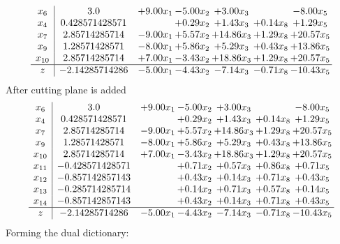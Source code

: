 \documentclass[8pt]{article}
\begin{document}
\[\begin{array}{c| c c@{\hskip 2pt} c@{\hskip 2pt} c@{\hskip 2pt} c@{\hskip 2pt} c@{\hskip 2pt} }
 x_{6}   &  3.0 & +  9.00 x_{1} & -5.00 x_{2} & +  3.00 x_{3} &   & -8.00 x_{5}\\
 x_{4}   &  0.428571428571  &   & +  0.29 x_{2} & +  1.43 x_{3} & +  0.14 x_{8} & +  1.29 x_{5}\\
 x_{7}   &  2.85714285714 & -9.00 x_{1} & +  5.57 x_{2} & + 14.86 x_{3} & +  1.29 x_{8} & + 20.57 x_{5}\\
 x_{9}   &  1.28571428571 & -8.00 x_{1} & +  5.86 x_{2} & +  5.29 x_{3} & +  0.43 x_{8} & + 13.86 x_{5}\\
 x_{10}   &  2.85714285714 & +  7.00 x_{1} & -3.43 x_{2} & + 18.86 x_{3} & +  1.29 x_{8} & + 20.57 x_{5}\\
\hline
z    &  -2.14285714286 & -5.00 x_{1} & -4.43 x_{2} & -7.14 x_{3} & -0.71 x_{8} & -10.43 x_{5}\\
\end{array}\]
 After cutting plane is added 
\[\begin{array}{c| c c@{\hskip 2pt} c@{\hskip 2pt} c@{\hskip 2pt} c@{\hskip 2pt} c@{\hskip 2pt} }
 x_{6}   &  3.0 & +  9.00 x_{1} & -5.00 x_{2} & +  3.00 x_{3} &   & -8.00 x_{5}\\
 x_{4}   &  0.428571428571  &   & +  0.29 x_{2} & +  1.43 x_{3} & +  0.14 x_{8} & +  1.29 x_{5}\\
 x_{7}   &  2.85714285714 & -9.00 x_{1} & +  5.57 x_{2} & + 14.86 x_{3} & +  1.29 x_{8} & + 20.57 x_{5}\\
 x_{9}   &  1.28571428571 & -8.00 x_{1} & +  5.86 x_{2} & +  5.29 x_{3} & +  0.43 x_{8} & + 13.86 x_{5}\\
 x_{10}   &  2.85714285714 & +  7.00 x_{1} & -3.43 x_{2} & + 18.86 x_{3} & +  1.29 x_{8} & + 20.57 x_{5}\\
 x_{11}   &  -0.428571428571  &   & +  0.71 x_{2} & +  0.57 x_{3} & +  0.86 x_{8} & +  0.71 x_{5}\\
 x_{12}   &  -0.857142857143  &   & +  0.43 x_{2} & +  0.14 x_{3} & +  0.71 x_{8} & +  0.43 x_{5}\\
 x_{13}   &  -0.285714285714  &   & +  0.14 x_{2} & +  0.71 x_{3} & +  0.57 x_{8} & +  0.14 x_{5}\\
 x_{14}   &  -0.857142857143  &   & +  0.43 x_{2} & +  0.14 x_{3} & +  0.71 x_{8} & +  0.43 x_{5}\\
\hline
z    &  -2.14285714286 & -5.00 x_{1} & -4.43 x_{2} & -7.14 x_{3} & -0.71 x_{8} & -10.43 x_{5}\\
\end{array}\]
Forming the dual dictionary:
\end{document}
